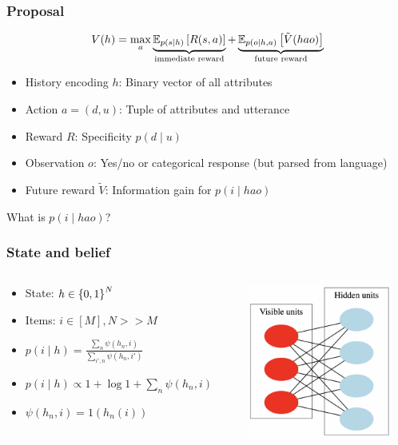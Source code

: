 \documentclass{beamer}
\begin{document}
\begin{frame}
\frametitle{Proposal}
\begin{equation*}
V(h) = \max_a \underbrace{\mathbb{E}_{p(s \mid h)}\left[R(s, a)\right]}_{\text{immediate reward}}
+ \underbrace{\mathbb{E}_{p(o\mid h, a)}\left[\tilde{V}(hao)\right]}_{\text{future reward}}
\end{equation*}
    \begin{itemize}
    \item History encoding $h$: Binary vector of all attributes
    \item Action $a = (d, u)$: Tuple of attributes and utterance
    \item Reward $R$: Specificity $p(d \mid u)$
    \item Observation $o$: Yes/no or categorical response (but parsed from language)
    \item Future reward $\tilde{V}$: Information gain for $p(i \mid hao)$
    \end{itemize}

What is $p(i\mid hao)$?
\end{frame}

\begin{frame}
\frametitle{State and belief}
\begin{columns}
\begin{column}{0.55\textwidth}
\begin{itemize}
\item State: $h \in \left\{0,1\right\}^N$
\item Items: $i \in [M], N >> M$
\item $p(i \mid h) = \frac{\sum_n \psi(h_n, i)}{\sum_{i',n} \psi(h_n, i')}$
\item  $p(i \mid h)\propto 1 + \log 1 + \sum_n \psi(h_n, i)$
\item $\psi(h_n, i) = 1(h_n(i))$ 
\end{itemize}
\end{column}
\begin{column}{0.45\textwidth}
\centering
\includegraphics[height=2in]{img/rbm.png}
\end{column}
\end{columns}
\end{frame}
\end{document}
